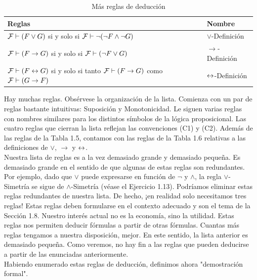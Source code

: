 \documentclass[12pt,a4paper]{book}
\newcommand{\comillas}[1]{"#1"}
\begin{document}
    \vspace{0.5cm}

    \begin{table}[htbp]
        \centering
        \small
        \caption{Más reglas de deducción}
        \renewcommand{\arraystretch}{1.5}
        \setlength{\tabcolsep}{8pt}
        \begin{tabular}{l l}
            Reglas & Nombre\\
            \hline
            $\mathcal{F}\vdash(F\vee G)$ si y solo si $\mathcal{F}\vdash\neg(\neg F\wedge\neg G)$ & $\vee$-Definición\\
            $\mathcal{F}\vdash(F\rightarrow G)$ si y solo si $\mathcal{F}\vdash(\neg F\vee G)$ & $\rightarrow$-Definición\\
            $\mathcal{F}\vdash(F\leftrightarrow G)$ si y solo si tanto $\mathcal{F}\vdash(F\rightarrow G)$ como $\mathcal{F}\vdash(G\rightarrow F)$ & $\leftrightarrow$-Definición\\
        \end{tabular}
    \end{table}

    \vspace{0.5cm}

    Hay muchas reglas. Obsérvese la organización de la lista. Comienza con un par de reglas bastante intuitivas: Suposición y
    Monotonicidad. Le siguen varias reglas con nombres similares para los distintos símbolos de la lógica proposicional. Las
    cuatro reglas que cierran la lista reflejan las convenciones (C1) y (C2). Además de las reglas de la Tabla 1.5, contamos con
    las reglas de la Tabla 1.6 relativas a las definiciones de $\vee$, $\rightarrow$ y $\leftrightarrow$.\\
    Nuestra lista de reglas es a la vez demasiado grande y demasiado pequeña. Es demasiado grande en el sentido de que algunas
    de estas reglas son redundantes. Por ejemplo, dado que $\vee$ puede expresarse en función de $\neg$ y $\wedge$, la regla
    $\vee$-Simetría se sigue de $\wedge$-Simetría (véase el Ejercicio 1.13). Podríamos eliminar estas reglas redundantes de
    nuestra lista. De hecho, ¡en realidad solo necesitamos tres reglas! Estas reglas deben formularse en el contexto adecuado y
    son el tema de la Sección 1.8. Nuestro interés actual no es la economía, sino la utilidad. Estas reglas nos permiten deducir
    fórmulas a partir de otras fórmulas. Cuantas más reglas tengamos a nuestra disposición, mejor. En este sentido, la lista
    anterior es demasiado pequeña. Como veremos, no hay fin a las reglas que pueden deducirse a partir de las enunciadas
    anteriormente.\\
    Habiendo enumerado estas reglas de deducción, definimos ahora \comillas{demostración formal}.
\end{document}
